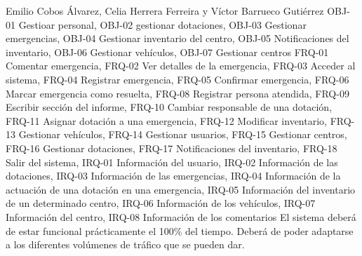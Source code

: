 {Emilio Cobos Álvarez, Celia Herrera Ferreira y Víctor Barrueco Gutiérrez}
{}
{OBJ-01 Gestioar personal, OBJ-02 gestionar dotaciones, OBJ-03 Gestionar emergencias, OBJ-04 Gestionar inventario del centro, OBJ-05 Notificaciones del inventario, OBJ-06 Gestionar vehículos, OBJ-07 Gestionar centros}
{FRQ-01 Comentar emergencia, FRQ-02 Ver detalles de la emergencia, FRQ-03 Acceder al sistema, FRQ-04 Registrar emergencia, FRQ-05 Confirmar emergencia, FRQ-06 Marcar emergencia como resuelta, FRQ-08 Registrar persona atendida, FRQ-09 Escribir sección del informe, FRQ-10 Cambiar responsable de una dotación, FRQ-11 Asignar dotación a una emergencia, FRQ-12 Modificar inventario, FRQ-13 Gestionar vehículos, FRQ-14 Gestionar usuarios, FRQ-15 Gestionar centros, FRQ-16 Gestionar dotaciones, FRQ-17 Notificaciones del inventario, FRQ-18 Salir del sistema, IRQ-01 Información del usuario, IRQ-02 Información de las dotaciones, IRQ-03 Información de las emergencias, IRQ-04 Información de la actuación de una dotación en una emergencia, IRQ-05 Información del inventario de un determinado centro, IRQ-06 Información de los vehículos, IRQ-07 Información del centro, IRQ-08 Información de los comentarios}
{El sistema deberá de estar funcional prácticamente el 100\% del tiempo. Deberá de poder adaptarse a los diferentes volúmenes de tráfico que se pueden dar.}

